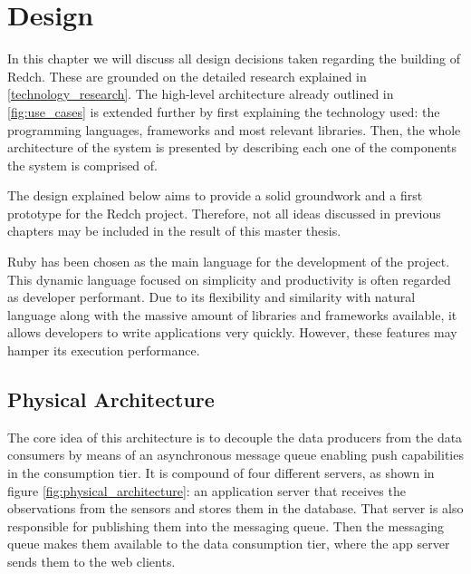 \chapter{Design}

In this chapter we will discuss all design decisions taken regarding the building of Redch. These are grounded on the detailed research explained in \ref{technology_research}. The high-level architecture already outlined in \ref{fig:use_cases} is extended further by first explaining the technology used: the programming languages, frameworks and most relevant libraries. Then, the whole architecture of the system is presented by describing each one of the components the system is comprised of.

The design explained below aims to provide a solid groundwork and a first prototype for the Redch project. Therefore, not all ideas discussed in previous chapters may be included in the result of this master thesis.

Ruby has been chosen as the main language for the development of the project. This dynamic language focused on simplicity and productivity is often regarded as developer performant. Due to its flexibility and similarity with natural language along with the massive amount of libraries and frameworks available, it allows developers to write applications very quickly. However, these features may hamper its execution performance.

\section{Physical Architecture}

The core idea of this architecture is to decouple the data producers from the data consumers by means of an asynchronous message queue enabling push capabilities in the consumption tier. It is compound of four different servers, as shown in figure \ref{fig:physical_architecture}: an application server that receives the observations from the sensors and stores them in the database. That server is also responsible for publishing them into the messaging queue. Then the messaging queue makes them available to the data consumption tier, where the app server sends them to the web clients.


